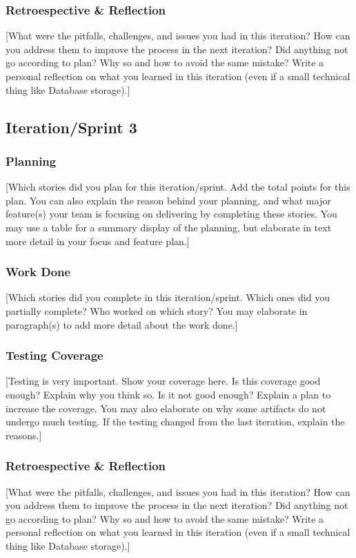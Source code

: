 \documentclass{article}
\begin{document}
\subsubsection{Retroespective \& Reflection}
[What were the pitfalls, challenges, and issues you had in this iteration? How can you address them to improve the process in the next iteration? Did anything not go according to plan? Why so and how to avoid the same mistake? Write a personal reflection on what you learned in this iteration (even if a small technical thing like Database storage).]

\subsection{Iteration/Sprint 3}
\subsubsection{Planning}
[Which stories did you plan for this iteration/sprint. Add the total points for this plan. You can also explain the reason behind your planning, and what major feature(s) your team is focusing on delivering by completing these stories. You may use a table for a summary display of the planning, but elaborate in text more detail in your focus and feature plan.]

\subsubsection{Work Done}
[Which stories did you complete in this iteration/sprint. Which ones did you partially complete? Who worked on which story? You may elaborate in paragraph(s) to add more detail about the work done.]

\subsubsection{Testing Coverage}
[Testing is very important. Show your coverage here. Is this coverage good enough? Explain why you think so. Is it not good enough? Explain a plan to increase the coverage. You may also elaborate on why some artifacts do not undergo much testing. If the testing changed from the last iteration, explain the reasons.]

\subsubsection{Retroespective \& Reflection}
[What were the pitfalls, challenges, and issues you had in this iteration? How can you address them to improve the process in the next iteration? Did anything not go according to plan? Why so and how to avoid the same mistake? Write a personal reflection on what you learned in this iteration (even if a small technical thing like Database storage).]
\end{document}

